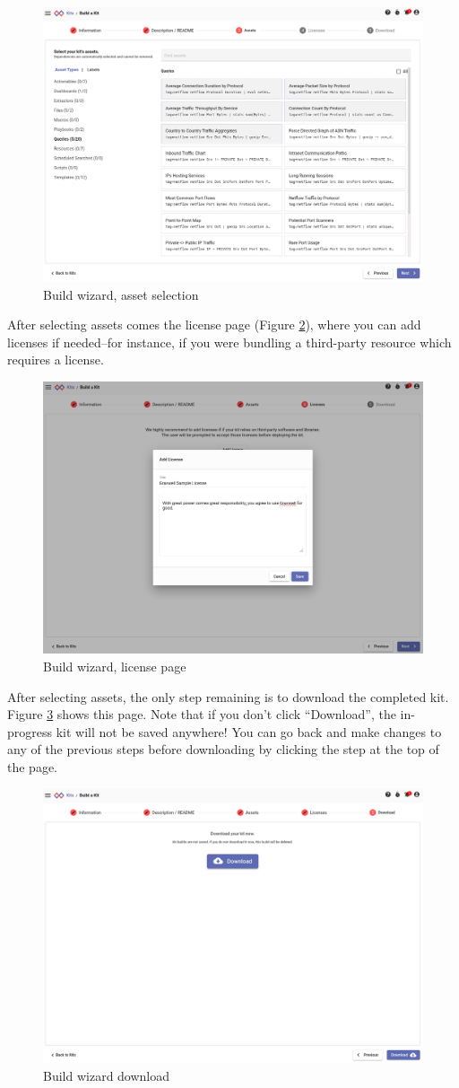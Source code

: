 \begin{figure}[H]
	\includegraphics[width=0.8\linewidth]{images/buildwizard3.png}
	\caption{Build wizard, asset selection}
	\label{fig:buildwizard3}
\end{figure}

After selecting assets comes the license page (Figure \ref{fig:buildwizard4}), where you can add licenses if needed--for instance, if you were bundling a third-party resource which requires a license.

\begin{figure}[H]
	\includegraphics[width=0.8\linewidth]{images/buildwizard4.png}
	\caption{Build wizard, license page}
	\label{fig:buildwizard4}
\end{figure}

After selecting assets, the only step remaining is to download the completed kit. Figure \ref{fig:buildwizard5} shows this page. Note that if you don't click ``Download'', the in-progress kit will not be saved anywhere! You can go back and make changes to any of the previous steps before downloading by clicking the step at the top of the page.

\begin{figure}[H]
	\includegraphics[width=0.8\linewidth]{images/buildwizard5.png}
	\caption{Build wizard download}
	\label{fig:buildwizard5}
\end{figure}
